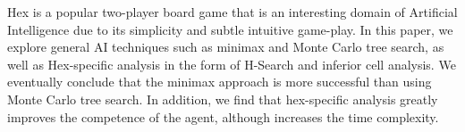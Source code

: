 Hex is a popular two-player board game that is an interesting domain of Artificial Intelligence due to its simplicity and subtle intuitive game-play. In this paper, we explore general AI techniques such as minimax and Monte Carlo tree search, as well as Hex-specific analysis in the form of H-Search and inferior cell analysis. We eventually conclude that the minimax approach is more successful than using Monte Carlo tree search. In addition, we find that hex-specific analysis greatly improves the competence of the agent, although increases the time complexity.